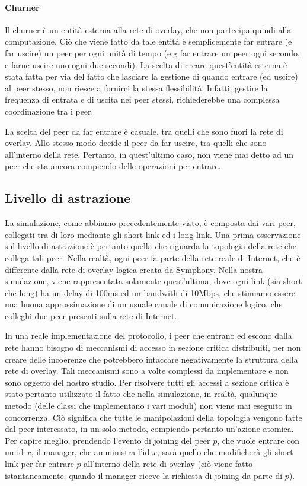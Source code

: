 \documentclass[prodmode,acmtap]{acmlarge}
\begin{document}
\paragraph{Churner}

Il churner è un entità esterna alla rete di overlay, che non partecipa quindi alla computazione. Ciò che viene fatto da tale entità è semplicemente far entrare (e far uscire) un peer per ogni unità di tempo (e.g far entrare un peer ogni secondo, e farne uscire uno ogni due secondi). La scelta di creare quest'entità esterna è stata fatta per via del fatto che lasciare la gestione di quando entrare (ed uscire) al peer stesso, non riesce a fornirci la stessa flessibilità. Infatti, gestire la frequenza di entrata e di uscita nei peer stessi, richiederebbe una complessa coordinazione tra i peer. 

La scelta del peer da far entrare è casuale, tra quelli che sono fuori la rete di overlay. Allo stesso modo decide il peer da far uscire, tra quelli che sono all'interno della rete. Pertanto, in quest'ultimo caso, non viene mai detto ad un peer che sta ancora compiendo delle operazioni per entrare.


\subsection{Livello di astrazione}

La simulazione, come abbiamo precedentemente visto, è composta dai vari peer, collegati tra di loro mediante gli short link ed i long link. Una prima osservazione sul livello di astrazione è pertanto quella che riguarda la topologia della rete che collega tali peer. Nella realtà, ogni peer fa parte della rete reale di Internet, che è differente dalla rete di overlay logica creata da Symphony. Nella nostra simulazione, viene rappresentata solamente quest'ultima, dove ogni link (sia short che long) ha un delay di 100ms ed un bandwith di 10Mbps, che stimiamo essere una buona approssimazione di un usuale canale di comunicazione logico, che colleghi due peer presenti sulla rete di Internet.

In una reale implementazione del protocollo, i peer che entrano ed escono dalla rete hanno bisogno di meccanismi di accesso in sezione critica distribuiti, per non creare delle incoerenze che potrebbero intaccare negativamente la struttura della rete di overlay. Tali meccanismi sono a volte complessi da implementare e non sono oggetto del nostro studio. Per risolvere tutti gli accessi a sezione critica è stato pertanto utilizzato il fatto che nella simulazione, in realtà, qualunque metodo (delle classi che implementano i vari moduli) non viene mai eseguito in concorrenza. Ciò significa che tutte le manipolazioni della topologia vengono fatte dal peer interessato, in un solo metodo, compiendo pertanto un'azione atomica. Per capire meglio, prendendo l'evento di joining del peer $p$, che vuole entrare con un id $x$, il manager, che amministra l'id $x$, sarà quello che modificherà gli short link per far entrare $p$ all'interno della rete di overlay (ciò viene fatto istantaneamente, quando il manager riceve la richiesta di joining da parte di $p$).
\end{document}
